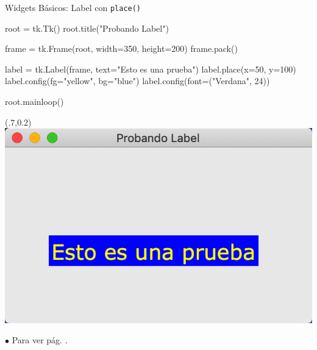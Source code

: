 \documentclass[10pt, envcountsect , spanish]{beamer}
\begin{document}
\begin{frame}[fragile]{Widgets Básicos: Label}
{ con {\tt place()}}

\begin{pyverbatim}[][frame=single]
root = tk.Tk()
root.title("Probando Label")


frame = tk.Frame(root, width=350, 
                                      height=200)
frame.pack()


label = tk.Label(frame, text="Esto es una prueba")
label.place(x=50, y=100)
label.config(fg="yellow", bg="blue")
label.config(font=("Verdana", 24))


root.mainloop()
\end{pyverbatim}

\begin{textblock*}{.25\textwidth}(.7\textwidth,0.2\textheight)
\includegraphics[width=\textwidth]{fig/label-sin-pack}
\end{textblock*}

{\scriptsize $\bullet$
Para  ver pág. \pageref{place}.
}
\end{frame}
\end{document}

